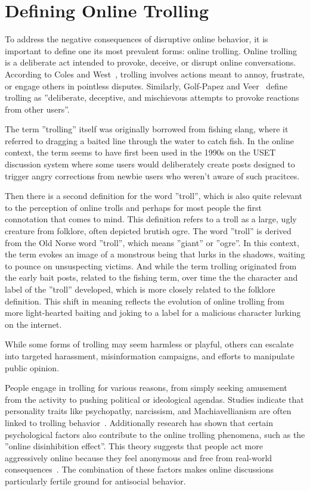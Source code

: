 \documentclass[twoside]{ctuthesis}
\theoremstyle{plain}
\theoremstyle{definition}
\theoremstyle{note}
\begin{document}
\section{Defining Online Trolling}
To address the negative consequences of disruptive online behavior, it is important to define one its most prevalent forms: online trolling. Online trolling is a deliberate act intended to provoke, deceive, or disrupt online conversations. According to Coles and West~\cite{Coles2016}, trolling involves actions meant to annoy, frustrate, or engage others in pointless disputes. Similarly, Golf-Papez and Veer~\cite{GolfPapez2017DontFeedTheTroll} define trolling as ''deliberate, deceptive, and mischievous attempts to provoke reactions from other users''.\par

The term ''trolling'' itself was originally borrowed from fishing slang, where it referred to dragging a baited line through the water to catch fish. In the online context, the term seems to have first been used  in the 1990s on the USET discussion system where some users would deliberately create posts designed to trigger angry corrections from newbie users who weren't aware of such pracitces.\par

Then there is a second definition for the word ''troll'', which is also quite relevant to the perception of online trolls and perhaps for most people the first connotation that comes to mind. This definition refers to a troll as a large, ugly creature from folklore, often depicted brutish ogre. The word ''troll'' is derived from the Old Norse word ''troll'', which means ''giant'' or ''ogre''. In this context, the term evokes an image of a monstrous being that lurks in the shadows, waiting to pounce on unsuspecting victims. And while the term trolling originated from the early bait posts, related to the fishing term, over time the the character and label of the ''troll'' developed, which is more closely related to the folklore definition. This shift in meaning reflects the evolution of online trolling from more light-hearted baiting and joking to a label for a malicious character lurking on the internet.\cite{Demsar2021}\par

While some forms of trolling may seem harmless or playful, others can escalate into targeted harassment, misinformation campaigns, and efforts to manipulate public opinion.\par
People engage in trolling for various reasons, from simply seeking amusement from the activity to pushing political or ideological agendas. Studies indicate that personality traits like psychopathy, narcissism, and Machiavellianism are often linked to trolling behavior~\cite{Buckels2014TrollsWantToHaveFun}. Additionally research has shown that certain psychological factors also contribute to the online trolling phenomena, such as the ''online disinhibition effect''. This theory suggests that people act more aggressively online because they feel anonymous and free from real-world consequences~\cite{Suler2004}. The combination of these factors makes online discussions particularly fertile ground for antisocial behavior. \par
\end{document}
